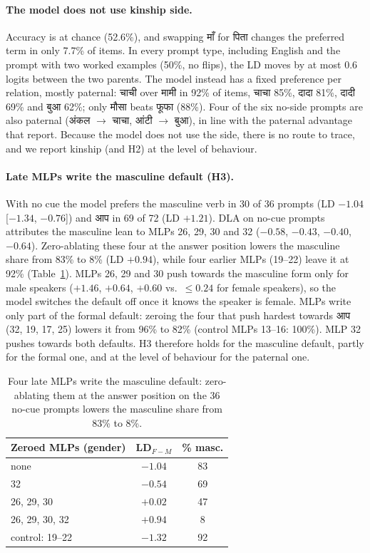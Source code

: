 \documentclass[11pt]{article}
\newcommand{\hi}[1]{{\devfont #1}}
\newcommand{\aap}{\hi{आप}}
\begin{document}
\paragraph{The model does not use kinship side.} Accuracy is at chance (52.6\%), and swapping \hi{माँ} for \hi{पिता} changes the preferred term in only 7.7\% of items. In every prompt type, including English and the prompt with two worked examples (50\%, no flips), the LD moves by at most 0.6 logits between the two parents. The model instead has a fixed preference per relation, mostly paternal: \hi{चाची} over \hi{मामी} in 92\% of items, \hi{चाचा} 85\%, \hi{दादा} 81\%, \hi{दादी} 69\% and \hi{बुआ} 62\%; only \hi{मौसा} beats \hi{फूफा} (88\%). Four of the six no-side prompts are also paternal (\hi{अंकल} $\to$ \hi{चाचा}, \hi{आंटी} $\to$ \hi{बुआ}), in line with the paternal advantage that \citet{pardasani2026} report. Because the model does not use the side, there is no route to trace, and we report kinship (and H2) at the level of behaviour.

\paragraph{Late MLPs write the masculine default (H3).} With no cue the model prefers the masculine verb in 30 of 36 prompts (LD $-1.04$ [$-1.34$, $-0.76$]) and \aap{} in 69 of 72 (LD $+1.21$). DLA on no-cue prompts attributes the masculine lean to MLPs 26, 29, 30 and 32 ($-0.58$, $-0.43$, $-0.40$, $-0.64$). Zero-ablating these four at the answer position lowers the masculine share from 83\% to 8\% (LD $+0.94$), while four earlier MLPs (19--22) leave it at 92\% (Table~\ref{tab:default}). MLPs 26, 29 and 30 push towards the masculine form only for male speakers ($+1.46$, $+0.64$, $+0.60$ vs.\ $\le 0.24$ for female speakers), so the model switches the default off once it knows the speaker is female. MLPs write only part of the formal default: zeroing the four that push hardest towards \aap{} (32, 19, 17, 25) lowers it from 96\% to 82\% (control MLPs 13--16: 100\%). MLP 32 pushes towards both defaults. H3 therefore holds for the masculine default, partly for the formal one, and at the level of behaviour for the paternal one.

\begin{table}[t]
\centering\small
\begin{tabular}{lcc}
\toprule
Zeroed MLPs (gender) & LD$_{F-M}$ & \% masc. \\
\midrule
none & $-1.04$ & 83 \\
32 & $-0.54$ & 69 \\
26, 29, 30 & $+0.02$ & 47 \\
26, 29, 30, 32 & $+0.94$ & 8 \\
control: 19--22 & $-1.32$ & 92 \\
\bottomrule
\end{tabular}
\caption{Four late MLPs write the masculine default: zero-ablating them at the answer position on the 36 no-cue prompts lowers the masculine share from 83\% to 8\%.}
\label{tab:default}
\end{table}
\end{document}
